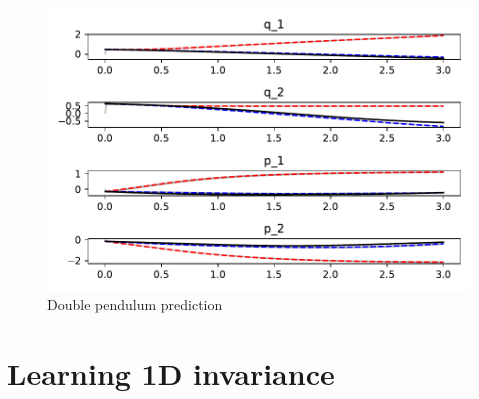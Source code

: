 \documentclass{statsmsc}
\begin{document}
\begin{figure}[H] 
  \includegraphics[width=0.6\linewidth]{../codes/figures/double_pendulum_predicted_trajectory.pdf}
  \centering
  \caption{Double pendulum prediction}
  \label{fig:double_pendulum_prediction}
\end{figure}


\section{Learning 1D invariance}
\end{document}
